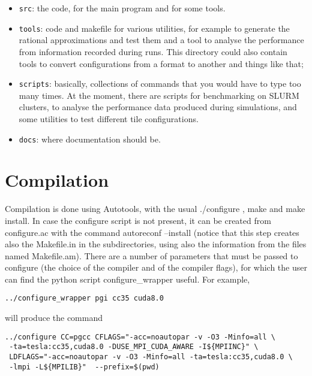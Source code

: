 \begin{itemize}
    \item \texttt{src}: the code, for the main program and for some tools.
    \item \texttt{tools}: code and makefile for various utilities, for example to generate the rational approximations and test them and a tool to analyse the performance from information recorded during runs. This directory could also contain tools to convert configurations from a format to another and things like that; 
    \item \texttt{scripts}: basically, collections of commands that you would have to type too many times. 
    At the moment, there are scripts for benchmarking on SLURM clusters, to analyse the performance data produced during simulations,
    and some utilities to test different \textsf{ tile} configurations.
    \item \texttt{docs}: where documentation should be.
\end{itemize}
\section{Compilation}
\label{compilation}
Compilation is done using Autotools, with the usual \textsf{ ./configure} , \textsf{ make} and \textsf{ make install}.
In case the \textsf{ configure} script is not present, it can be created from \textsf{ configure.ac} 
with the command \textsf{autoreconf --install} (notice that this step creates also the \textsf{ Makefile.in} in the subdirectories, 
using also the information from the files named \textsf{ Makefile.am}). 
There are a number of parameters that must be passed to \textsf{ configure} (the choice of the compiler and of the compiler flags), for which the user can find the python script \textsf{ configure\_wrapper} useful. For example,
\begin{verbatim}
../configure_wrapper pgi cc35 cuda8.0
\end{verbatim}
will produce the command
\begin{verbatim}
../configure CC=pgcc CFLAGS="-acc=noautopar -v -O3 -Minfo=all \
 -ta=tesla:cc35,cuda8.0 -DUSE_MPI_CUDA_AWARE -I${MPIINC}" \
 LDFLAGS="-acc=noautopar -v -O3 -Minfo=all -ta=tesla:cc35,cuda8.0 \
 -lmpi -L${MPILIB}"  --prefix=$(pwd)
\end{verbatim}

